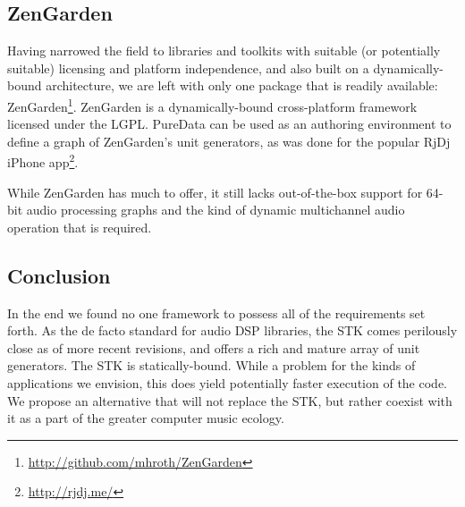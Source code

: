 \documentclass[twoside,10pt]{article}
\begin{document}


\subsection{ZenGarden} %

Having narrowed the field to libraries and toolkits with suitable (or potentially suitable) licensing and platform independence, and also built on a dynamically-bound architecture, we are left with only one package that is readily available: ZenGarden\footnote{\url{http://github.com/mhroth/ZenGarden}}.  ZenGarden is a dynamically-bound cross-platform framework licensed under the LGPL.  PureData can be used as an authoring environment to define a graph of ZenGarden's unit generators, as was done for the popular RjDj iPhone app\footnote{\url{http://rjdj.me/}}.

While ZenGarden has much to offer, it still lacks out-of-the-box support for 64-bit audio processing graphs and the kind of dynamic multichannel audio operation that is required.



\subsection{Conclusion} %

In the end we found no one framework to possess all of the requirements set forth.  As the de facto standard for audio DSP libraries, the STK comes perilously close as of more recent revisions\cite{Scavone:2005}, and offers a rich and mature array of unit generators.  The STK is statically-bound.  While a problem for the kinds of applications we envision, this does yield potentially faster execution of the code.  We propose an alternative that will not replace the STK, but rather coexist with it as a part of the greater computer music ecology.


%
\end{document}
